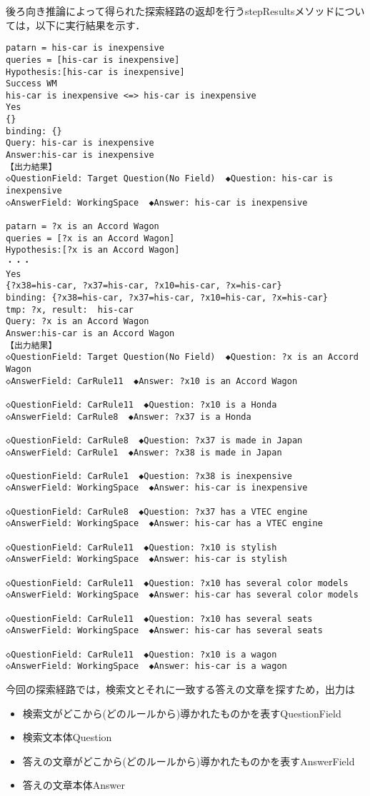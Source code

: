 \documentclass[12pt]{jarticle}
\begin{document}
後ろ向き推論によって得られた探索経路の返却を行うstepResultsメソッドについては，以下に実行結果を示す．
\begin{lstlisting}[caption=stepResultsメソッドの実行結果,label=kekka4]
patarn = his-car is inexpensive
queries = [his-car is inexpensive]
Hypothesis:[his-car is inexpensive]
Success WM
his-car is inexpensive <=> his-car is inexpensive
Yes
{}
binding: {}
Query: his-car is inexpensive
Answer:his-car is inexpensive
【出力結果】
◇QuestionField: Target Question(No Field)  ◆Question: his-car is inexpensive
◇AnswerField: WorkingSpace  ◆Answer: his-car is inexpensive

patarn = ?x is an Accord Wagon
queries = [?x is an Accord Wagon]
Hypothesis:[?x is an Accord Wagon]
・・・
Yes
{?x38=his-car, ?x37=his-car, ?x10=his-car, ?x=his-car}
binding: {?x38=his-car, ?x37=his-car, ?x10=his-car, ?x=his-car}
tmp: ?x, result:  his-car
Query: ?x is an Accord Wagon
Answer:his-car is an Accord Wagon
【出力結果】
◇QuestionField: Target Question(No Field)  ◆Question: ?x is an Accord Wagon
◇AnswerField: CarRule11  ◆Answer: ?x10 is an Accord Wagon

◇QuestionField: CarRule11  ◆Question: ?x10 is a Honda
◇AnswerField: CarRule8  ◆Answer: ?x37 is a Honda

◇QuestionField: CarRule8  ◆Question: ?x37 is made in Japan
◇AnswerField: CarRule1  ◆Answer: ?x38 is made in Japan

◇QuestionField: CarRule1  ◆Question: ?x38 is inexpensive
◇AnswerField: WorkingSpace  ◆Answer: his-car is inexpensive

◇QuestionField: CarRule8  ◆Question: ?x37 has a VTEC engine
◇AnswerField: WorkingSpace  ◆Answer: his-car has a VTEC engine

◇QuestionField: CarRule11  ◆Question: ?x10 is stylish
◇AnswerField: WorkingSpace  ◆Answer: his-car is stylish

◇QuestionField: CarRule11  ◆Question: ?x10 has several color models
◇AnswerField: WorkingSpace  ◆Answer: his-car has several color models

◇QuestionField: CarRule11  ◆Question: ?x10 has several seats
◇AnswerField: WorkingSpace  ◆Answer: his-car has several seats

◇QuestionField: CarRule11  ◆Question: ?x10 is a wagon
◇AnswerField: WorkingSpace  ◆Answer: his-car is a wagon
\end{lstlisting}
今回の探索経路では，検索文とそれに一致する答えの文章を探すため，出力は
\begin{itemize}
	\item 検索文がどこから(どのルールから)導かれたものかを表すQuestionField　
	\item 検索文本体Question
	\item 答えの文章がどこから(どのルールから)導かれたものかを表すAnswerField
	\item 答えの文章本体Answer
\end{itemize}
\end{document}
